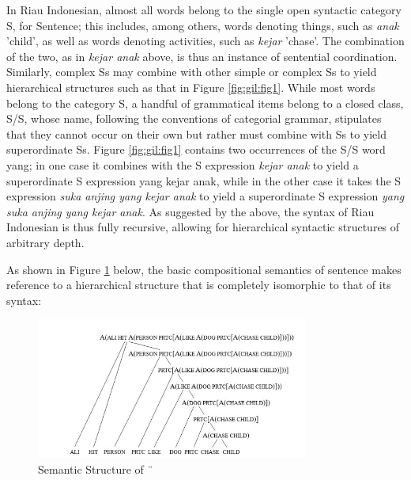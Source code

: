 \documentclass[output=paper,colorlinks,citecolor=brown
]{langscibook}
\begin{document}
In Riau Indonesian, almost all words belong to the single open syntactic category S, for Sentence; this includes, among others, words denoting things, such as \emph{anak} 'child', as well as words denoting activities, such as \emph{kejar} 'chase'. The combination of the two, as in \emph{kejar anak} above, is thus an instance of sentential coordination. Similarly, complex Ss may combine with other simple or complex Ss to yield hierarchical structures such as that in Figure \ref{fig:gil:fig1}. While most words belong to the category S, a handful of grammatical items belong to a closed class, S/S, whose name, following the conventions of categorial grammar, stipulates that they cannot occur on their own but rather must combine with Ss to yield superordinate Ss. Figure \ref{fig:gil:fig1} contains two occurrences of the S/S word yang; in one case it combines with the S expression \emph{kejar anak} to yield a superordinate S expression yang kejar anak, while in the other case it takes the S expression \emph{suka anjing yang kejar anak} to yield a superordinate S expression \emph{yang suka anjing yang kejar anak}. As suggested by the above, the syntax of Riau Indonesian is thus fully recursive, allowing for hierarchical syntactic structures of arbitrary depth.

As shown in Figure \ref{fig:gil:fig2} below, the basic compositional semantics of sentence  makes reference to a hierarchical structure that is completely isomorphic to that of its syntax:

\begin{figure}
\centering
\includegraphics[width=0.8\textwidth]{gil_figure2.png}
\caption{\label{fig:gil:fig2}Semantic Structure of ¨}
\end{figure}
\end{document}
